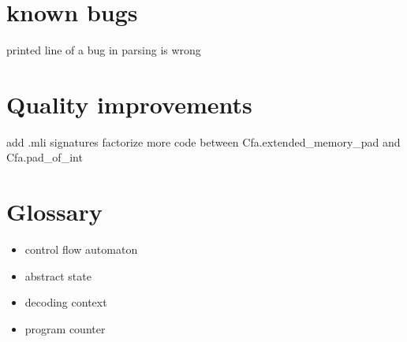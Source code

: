 \documentclass{report}
\begin{document}
\chapter{known bugs}
printed line of a bug in parsing is wrong
\chapter{Quality improvements}
add  .mli signatures
factorize more code between Cfa.extended_memory_pad and
Cfa.pad_of_int 
\chapter{Glossary}
\begin{itemize}
\item control flow automaton
\item abstract state
\item decoding context
\item program counter
\end{itemize}
\end{document}
